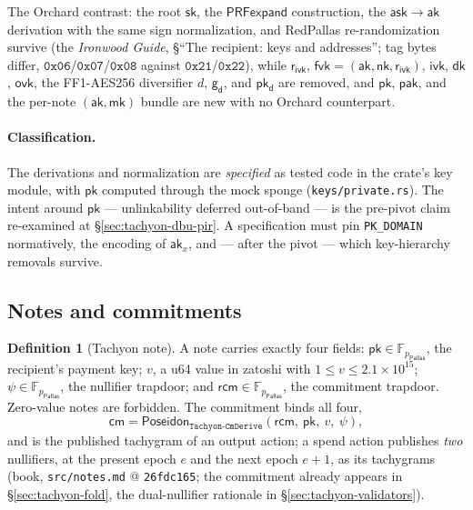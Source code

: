 \documentclass[11pt,a4paper]{article}
\theoremstyle{definition}
\newtheorem{definition}[theorem]{Definition}
\newcommand{\F}{\mathbb{F}}
\newcommand{\cmsym}{\mathsf{cm}}
\newcommand{\Pallas}{\ensuremath{\mathsf{Pallas}}}
\newcommand{\ask}{\ensuremath{\mathsf{ask}}}
\newcommand{\aksym}{\ensuremath{\mathsf{ak}}}
\newcommand{\nksym}{\ensuremath{\mathsf{nk}}}
\newcommand{\ivk}{\ensuremath{\mathsf{ivk}}}
\newcommand{\fvk}{\ensuremath{\mathsf{fvk}}}
\newcommand{\ovk}{\ensuremath{\mathsf{ovk}}}
\newcommand{\dk}{\ensuremath{\mathsf{dk}}}
\newcommand{\pkd}{\ensuremath{\mathsf{pk_d}}}
\newcommand{\gd}{\ensuremath{\mathsf{g_d}}}
\newcommand{\rcm}{\ensuremath{\mathsf{rcm}}}
\newcommand{\rivk}{\ensuremath{\mathsf{r_{ivk}}}}
\begin{document}
The Orchard contrast: the root $\mathsf{sk}$, the $\mathsf{PRFexpand}$
construction, the $\ask \to \aksym$ derivation with the same sign
normalization, and RedPallas re-randomization survive (the \emph{Ironwood
Guide}, \S``The recipient: keys and addresses''; tag bytes
differ, $\mathtt{0x06}$/$\mathtt{0x07}$/$\mathtt{0x08}$ against
$\mathtt{0x21}$/$\mathtt{0x22}$), while $\rivk$, $\fvk = (\aksym, \nksym,
\rivk)$, $\ivk$, $\dk$, $\ovk$, the FF1-AES256 diversifier $d$, $\gd$, and
$\pkd$ are removed, and $\mathsf{pk}$, $\mathsf{pak}$, and the per-note
$(\aksym, \mathsf{mk})$ bundle are new with no Orchard counterpart.

\paragraph{Classification.} The derivations and normalization are
\emph{specified} as tested code in the crate's key module, with
$\mathsf{pk}$ computed through the mock sponge
(\texttt{keys/private.rs}). The intent around $\mathsf{pk}$ ---
unlinkability deferred out-of-band --- is the pre-pivot claim re-examined
at \S\ref{sec:tachyon-dbu-pir}. A specification must pin
\texttt{PK\_DOMAIN} normatively, the encoding of $\aksym_x$, and --- after
the pivot --- which key-hierarchy removals survive.

\subsection{Notes and commitments}\label{sec:tachyon-design-notes}

\begin{definition}[Tachyon note]\label{def:tachyon-design-note}
A note carries exactly four fields: $\mathsf{pk} \in \F_{p_{\Pallas}}$, the
recipient's payment key; $v$, a u64 value in zatoshi with
$1 \leq v \leq 2.1 \times 10^{15}$; $\psi \in \F_{p_{\Pallas}}$, the
nullifier trapdoor; and $\rcm \in \F_{p_{\Pallas}}$, the commitment
trapdoor. Zero-value notes are forbidden. The commitment binds all four,
\[
\cmsym = \mathsf{Poseidon}_{\texttt{Tachyon-CmDerive}}
  (\rcm,\ \mathsf{pk},\ v,\ \psi),
\]
and is the published tachygram of an output action; a spend action
publishes \emph{two} nullifiers, at the present epoch $e$ and the next
epoch $e+1$, as its tachygrams (book, \texttt{src/notes.md} @
\texttt{26fdc165}; the commitment already appears in
\S\ref{sec:tachyon-fold}, the dual-nullifier rationale in
\S\ref{sec:tachyon-validators}).
\end{definition}
\end{document}
